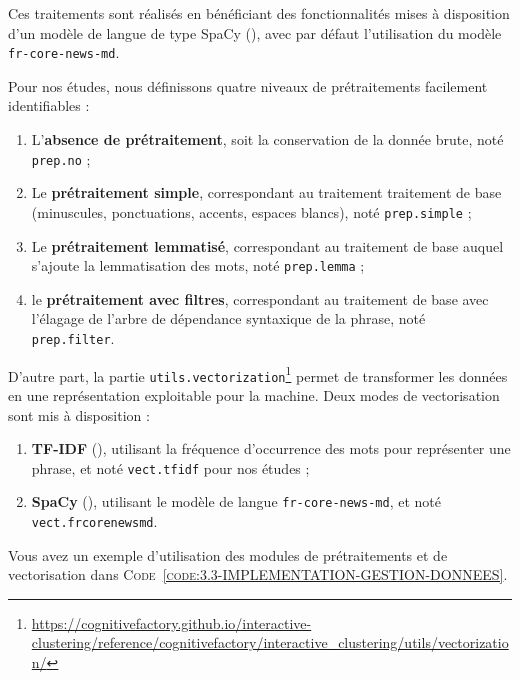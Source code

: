 		Ces traitements sont réalisés en bénéficiant des fonctionnalités mises à disposition d'un modèle de langue de type SpaCy (\cite{honnibal-montani:2017:spacy-natural-language}), avec par défaut l'utilisation du modèle \texttt{fr-core-news-md}.
		
		Pour nos études, nous définissons quatre niveaux de prétraitements facilement identifiables :
		\begin{enumerate}
			\item L'\textbf{absence de prétraitement}, soit la conservation de la donnée brute, noté \texttt{prep.no} ;
			\item Le \textbf{prétraitement simple}, correspondant au traitement traitement de base (minuscules, ponctuations, accents, espaces blancs), noté \texttt{prep.simple} ; 
			\item Le \textbf{prétraitement lemmatisé}, correspondant au traitement de base auquel s'ajoute la lemmatisation des mots, noté \texttt{prep.lemma} ;
			\item le \textbf{prétraitement avec filtres}, correspondant au traitement de base avec l'élagage de l'arbre de dépendance syntaxique de la phrase, noté \texttt{prep.filter}.
		\end{enumerate}
		
		
		D'autre part, la partie \texttt{utils.vectorization}\footnote{\url{https://cognitivefactory.github.io/interactive-clustering/reference/cognitivefactory/interactive_clustering/utils/vectorization/}} permet de transformer les données en une représentation exploitable pour la machine.
		Deux modes de vectorisation sont mis à disposition :
		\begin{enumerate}
			\item \textbf{TF-IDF} (\cite{ramos:2003:using-tfidf-determine}), utilisant la fréquence d'occurrence des mots pour représenter une phrase, et noté \texttt{vect.tfidf} pour nos études ;
			\item \textbf{SpaCy} (\cite{honnibal-montani:2017:spacy-natural-language}), utilisant le modèle de langue \texttt{fr-core-news-md}, et noté \texttt{vect.frcorenewsmd}.
		\end{enumerate}
		
		Vous avez un exemple d'utilisation des modules de prétraitements et de vectorisation dans \textsc{Code~\ref{code:3.3-IMPLEMENTATION-GESTION-DONNEES}}.
		
